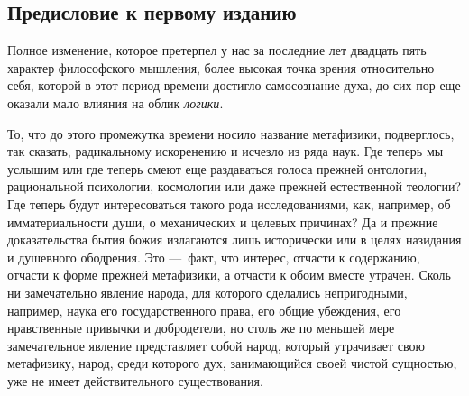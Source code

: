 \clearpage\subsection{Предисловие к первому изданию}
Полное изменение, которое претерпел у нас за
последние лет двадцать пять характер философского мышления, более высокая
точка зрения относительно себя, которой в этот период времени достигло
самосознание духа, до сих пор еще оказали мало влияния на облик
{\em логики}.

То, что до этого промежутка времени носило название метафизики, подверглось,
так сказать, радикальному искоренению и исчезло из ряда наук. Где теперь мы
услышим или где теперь смеют еще раздаваться голоса прежней онтологии,
рациональной психологии, космологии или даже прежней естественной теологии?
Где теперь будут интересоваться такого рода исследованиями, как, например,
об имматериальности души, о механических и целевых причинах? Да и прежние
доказательства бытия божия излагаются лишь исторически или в целях
назидания и душевного ободрения. Это —~факт, что интерес, отчасти к
содержанию, отчасти к форме прежней метафизики, а отчасти к обоим вместе
утрачен. Сколь ни замечательно явление народа, для которого сделались
непригодными, например, наука его государственного права, его общие
убеждения, его нравственные привычки и добродетели, но столь же по меньшей
мере замечательное явление представляет собой народ, который утрачивает
свою метафизику, народ, среди которого дух, занимающийся своей чистой
сущностью, уже не имеет действительного существования.

